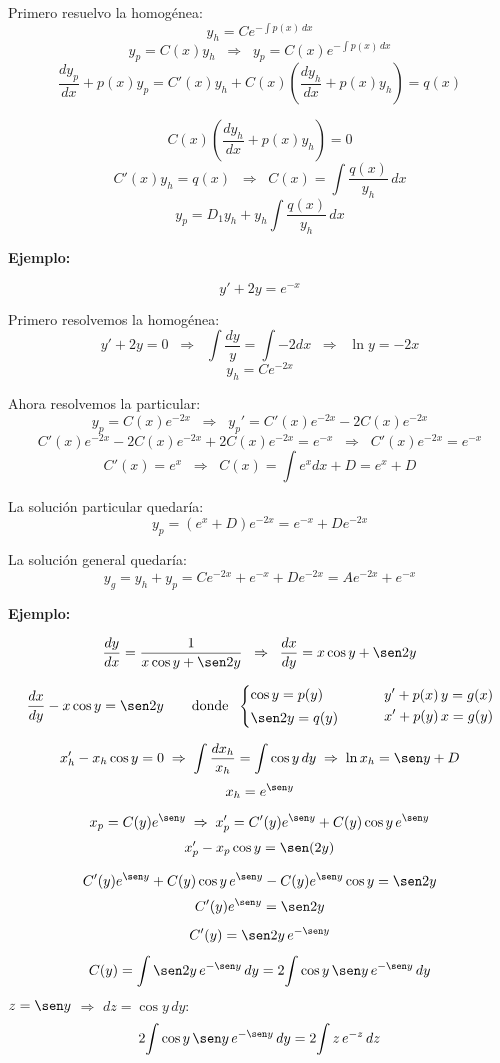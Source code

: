 \documentclass[a4paper,12pt]{article}
\begin{document}
Primero resuelvo la homogénea:
\[
y_h = C e^{-\int p(x)\,dx}
\]
\[
y_p = C(x)y_h \;\;\Rightarrow\;\; y_p = C(x)e^{-\int p(x)\,dx}
\]
\[
\frac{dy_p}{dx}+p(x)y_p = C'(x)y_h + C(x)\left(\frac{dy_h}{dx}+p(x)y_h\right)=q(x)
\]

\[
C(x)\left(\frac{dy_h}{dx}+p(x)y_h\right)=0
\]
\[
C'(x)y_h=q(x)
\;\;\Rightarrow\;\;
C(x)=\int \frac{q(x)}{y_h}\,dx
\]
\[
y_p = D_1 y_h + y_h \int \frac{q(x)}{y_h}\,dx
\]

\textbf{Ejemplo:}

\[
y' + 2y = e^{-x}
\]

Primero resolvemos la homogénea:
\[
y' + 2y = 0 \;\;\Rightarrow\;\; \int \frac{dy}{y} = \int -2dx 
\;\;\Rightarrow\;\; \ln y = -2x
\]
\[
y_h = Ce^{-2x}
\]

Ahora resolvemos la particular:
\[
y_p = C(x)e^{-2x} \;\;\Rightarrow\;\; 
y_p' = C'(x)e^{-2x} - 2C(x)e^{-2x}
\]
\[
C'(x)e^{-2x} - 2C(x)e^{-2x} + 2C(x)e^{-2x} = e^{-x} 
\;\;\Rightarrow\;\; C'(x)e^{-2x} = e^{-x}
\]
\[
C'(x) = e^x \;\;\Rightarrow\;\; C(x) = \int e^x dx + D = e^x + D
\]

La solución particular quedaría:
\[
y_p = (e^x + D)e^{-2x} = e^{-x} + De^{-2x}
\]

La solución general quedaría:
\[
y_g = y_h + y_p = Ce^{-2x} + e^{-x} + De^{-2x}
= Ae^{-2x} + e^{-x}
\]

\textbf{Ejemplo:}

\[
\frac{dy}{dx}=\frac{1}{x\cos y+\sen 2y}
\;\;\Rightarrow\;\;
\frac{dx}{dy}=x\cos y+\sen 2y
\]

\[
\frac{dx}{dy}-x\cos y=\sen 2y
\qquad
\text{donde }\;
\begin{cases}
\cos y = p(y)\\[2pt]
\sen 2y = q(y)
\end{cases}
\qquad
\begin{aligned}
&y'+p(x)\,y=g(x)\\
&x'+p(y)\,x=g(y)
\end{aligned}
\]

\[
x_h'-x_h\cos y=0
\;\Rightarrow\;
\int \frac{dx_h}{x_h}=\int \cos y\,dy
\;\Rightarrow\;
\ln x_h=\sen y + D
\]
\[
x_h=e^{\sen y}
\]

\[
x_p=C(y)e^{\sen y}
\;\Rightarrow\;
x_p'=C'(y)e^{\sen y}+C(y)\cos y\,e^{\sen y}
\]
\[
x_p'-x_p\cos y=\sen(2y)
\]

\[
C'(y)e^{\sen y}+C(y)\cos y\,e^{\sen y}-C(y)e^{\sen y}\cos y=\sen 2y
\]
\[
\begin{gathered}
 C'(y)e^{\sen y} = \sen 2y \\[4pt]
 C'(y) = \sen 2y\,e^{-\sen y} \\[4pt]
 C(y) = \int \sen 2y\,e^{-\sen y}\,dy  = 2\!\int \cos y\,\sen y\,e^{-\sen y}\,dy
\end{gathered}
\]
 \(z=\sen y\) \(\Rightarrow\) \(dz=\cos y\,dy\):
\[
2\!\int \cos y\,\sen y\,e^{-\sen y}\,dy
=2\!\int z\,e^{-z}\,dz
\]
\end{document}

